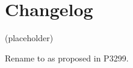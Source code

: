 \section{Changelog}
(placeholder)
\begin{revision}
\item Rename  to  as proposed in P3299.
\end{revision}
